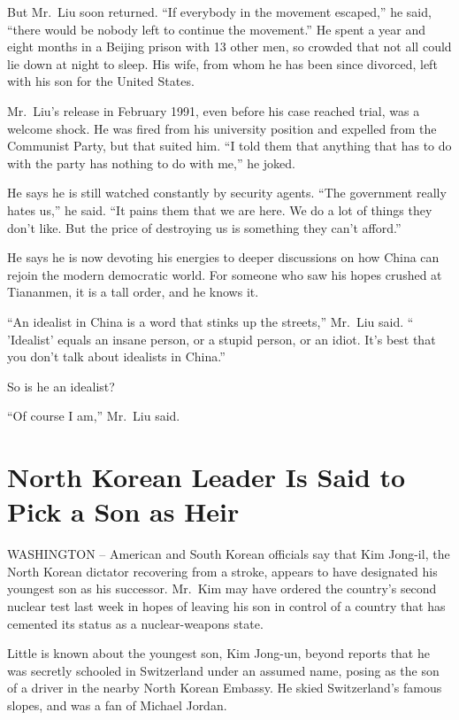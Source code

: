 \documentclass[12pt,a4paper,onecolumn]{article}
\begin{document}
But Mr.~Liu soon returned. ``If everybody in the movement escaped,'' he said, ``there would be
nobody left to continue the movement.'' He spent a year and eight months in a Beijing prison with 13
other men, so crowded that not all could lie down at night to sleep. His wife, from whom he has been
since divorced, left with his son for the United States.

Mr.~Liu's release in February 1991, even before his case reached trial, was a welcome shock. He was
fired from his university position and expelled from the Communist Party, but that suited him. ``I
told them that anything that has to do with the party has nothing to do with me,'' he joked.

He says he is still watched constantly by security agents. ``The government really hates us,'' he
said. ``It pains them that we are here. We do a lot of things they don't like. But the price of
destroying us is something they can't afford.''

He says he is now devoting his energies to deeper discussions on how China can rejoin the modern
democratic world. For someone who saw his hopes crushed at Tiananmen, it is a tall order, and he
knows it.

``An idealist in China is a word that stinks up the streets,'' Mr.~Liu said. `` 'Idealist' equals an
insane person, or a stupid person, or an idiot. It's best that you don't talk about idealists in
China.''

So is he an idealist?

``Of course I am,'' Mr.~Liu said.

\section{North Korean Leader Is Said to Pick a Son as Heir}

WASHINGTON -- American and South Korean officials say that Kim Jong-il, the North Korean dictator
recovering from a stroke, appears to have designated his youngest son as his successor. Mr.~Kim may
have ordered the country's second nuclear test last week in hopes of leaving his son in control of a
country that has cemented its status as a nuclear-weapons state.

Little is known about the youngest son, Kim Jong-un, beyond reports that he was secretly schooled in
Switzerland under an assumed name, posing as the son of a driver in the nearby North Korean Embassy.
He skied Switzerland's famous slopes, and was a fan of Michael Jordan.
\end{document}
